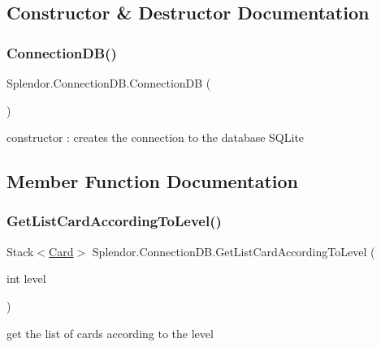 \subsection{Constructor \& Destructor Documentation}
\mbox{\label{class_splendor_1_1_connection_d_b_aaaa5c66d4f12702d36a76dd21beb62c4}} 
\subsubsection{\texorpdfstring{Connection\+D\+B()}{ConnectionDB()}}
{\footnotesize\ttfamily Splendor.\+Connection\+D\+B.\+Connection\+DB (\begin{DoxyParamCaption}{ }\end{DoxyParamCaption})}



constructor \+: creates the connection to the database S\+Q\+Lite 



\subsection{Member Function Documentation}
\mbox{\label{class_splendor_1_1_connection_d_b_abcd995d0fa97aa5f3a40ff5c23b22502}} 
\subsubsection{\texorpdfstring{Get\+List\+Card\+According\+To\+Level()}{GetListCardAccordingToLevel()}}
{\footnotesize\ttfamily Stack$<$\mbox{\hyperlink{class_splendor_1_1_card}{Card}}$>$ Splendor.\+Connection\+D\+B.\+Get\+List\+Card\+According\+To\+Level (\begin{DoxyParamCaption}\item[{int}]{level }\end{DoxyParamCaption})}



get the list of cards according to the level 

